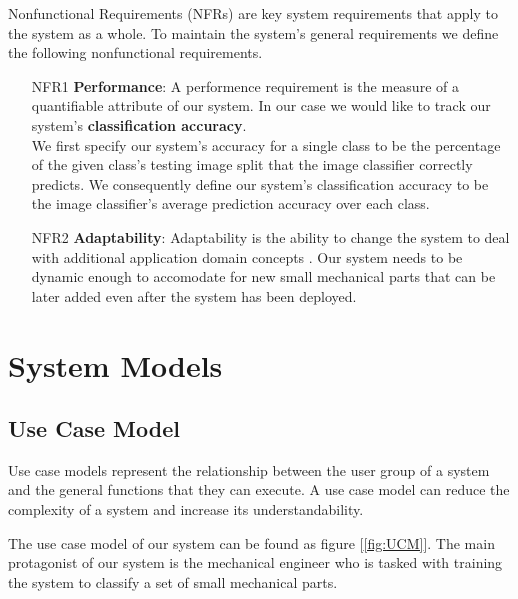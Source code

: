 \documentclass[a4paper,12pt,twoside]{report}
\begin{document}
Nonfunctional Requirements (NFRs) are key system requirements that apply to the system as a whole. To maintain the system's general requirements we define the following nonfunctional requirements.

\begin{itemize}
  \item [NFR1] \textbf{Performance}: A performence requirement is the measure of a quantifiable attribute of our system. In our case we would like to track our system's \textbf{classification accuracy}.\\
  We first specify our system's accuracy for a single class to be the percentage of the given class's testing image split that the image classifier correctly predicts. We consequently define our system's classification accuracy to be the image classifier's average prediction accuracy over each class.

  \item [NFR2] \textbf{Adaptability}: Adaptability is the ability to change the system to deal with additional application domain concepts \cite{bruegge2004object}. Our system needs to be dynamic enough to accomodate for new small mechanical parts that can be later added even after the system has been deployed.
\end{itemize}

\section{System Models}

\subsection{Use Case Model}

Use case models represent the relationship between the user group of a system and the general functions that they can execute. A use case model can reduce the complexity of a system and increase its understandability.

The use case model of our system can be found as figure [\ref{fig:UCM}]. The main protagonist of our system is the mechanical engineer who is tasked with training the system to classify a set of small mechanical parts.
\end{document}
